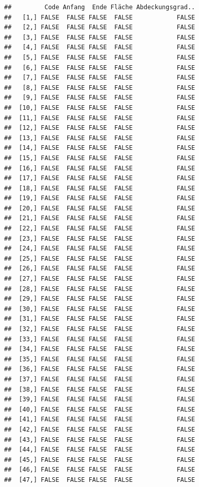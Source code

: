 \documentclass[
  english,
  man,floatsintext]{apa6}
\begin{document}
\begin{verbatim}
##         Code Anfang  Ende Fläche Abdeckungsgrad..
##   [1,] FALSE  FALSE FALSE  FALSE            FALSE
##   [2,] FALSE  FALSE FALSE  FALSE            FALSE
##   [3,] FALSE  FALSE FALSE  FALSE            FALSE
##   [4,] FALSE  FALSE FALSE  FALSE            FALSE
##   [5,] FALSE  FALSE FALSE  FALSE            FALSE
##   [6,] FALSE  FALSE FALSE  FALSE            FALSE
##   [7,] FALSE  FALSE FALSE  FALSE            FALSE
##   [8,] FALSE  FALSE FALSE  FALSE            FALSE
##   [9,] FALSE  FALSE FALSE  FALSE            FALSE
##  [10,] FALSE  FALSE FALSE  FALSE            FALSE
##  [11,] FALSE  FALSE FALSE  FALSE            FALSE
##  [12,] FALSE  FALSE FALSE  FALSE            FALSE
##  [13,] FALSE  FALSE FALSE  FALSE            FALSE
##  [14,] FALSE  FALSE FALSE  FALSE            FALSE
##  [15,] FALSE  FALSE FALSE  FALSE            FALSE
##  [16,] FALSE  FALSE FALSE  FALSE            FALSE
##  [17,] FALSE  FALSE FALSE  FALSE            FALSE
##  [18,] FALSE  FALSE FALSE  FALSE            FALSE
##  [19,] FALSE  FALSE FALSE  FALSE            FALSE
##  [20,] FALSE  FALSE FALSE  FALSE            FALSE
##  [21,] FALSE  FALSE FALSE  FALSE            FALSE
##  [22,] FALSE  FALSE FALSE  FALSE            FALSE
##  [23,] FALSE  FALSE FALSE  FALSE            FALSE
##  [24,] FALSE  FALSE FALSE  FALSE            FALSE
##  [25,] FALSE  FALSE FALSE  FALSE            FALSE
##  [26,] FALSE  FALSE FALSE  FALSE            FALSE
##  [27,] FALSE  FALSE FALSE  FALSE            FALSE
##  [28,] FALSE  FALSE FALSE  FALSE            FALSE
##  [29,] FALSE  FALSE FALSE  FALSE            FALSE
##  [30,] FALSE  FALSE FALSE  FALSE            FALSE
##  [31,] FALSE  FALSE FALSE  FALSE            FALSE
##  [32,] FALSE  FALSE FALSE  FALSE            FALSE
##  [33,] FALSE  FALSE FALSE  FALSE            FALSE
##  [34,] FALSE  FALSE FALSE  FALSE            FALSE
##  [35,] FALSE  FALSE FALSE  FALSE            FALSE
##  [36,] FALSE  FALSE FALSE  FALSE            FALSE
##  [37,] FALSE  FALSE FALSE  FALSE            FALSE
##  [38,] FALSE  FALSE FALSE  FALSE            FALSE
##  [39,] FALSE  FALSE FALSE  FALSE            FALSE
##  [40,] FALSE  FALSE FALSE  FALSE            FALSE
##  [41,] FALSE  FALSE FALSE  FALSE            FALSE
##  [42,] FALSE  FALSE FALSE  FALSE            FALSE
##  [43,] FALSE  FALSE FALSE  FALSE            FALSE
##  [44,] FALSE  FALSE FALSE  FALSE            FALSE
##  [45,] FALSE  FALSE FALSE  FALSE            FALSE
##  [46,] FALSE  FALSE FALSE  FALSE            FALSE
##  [47,] FALSE  FALSE FALSE  FALSE            FALSE

\end{verbatim}
\end{document}

